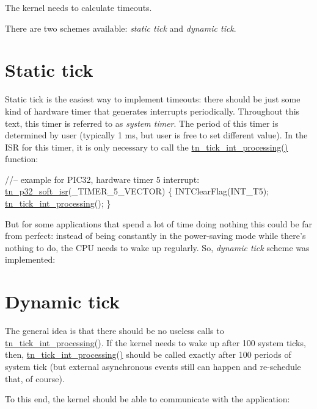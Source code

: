The kernel needs to calculate timeouts.

There are two schemes available\+: {\itshape static tick} and {\itshape dynamic tick}.\hypertarget{time_ticks_time_ticks__static_tick}{}\section{Static tick}\label{time_ticks_time_ticks__static_tick}
Static tick is the easiest way to implement timeouts\+: there should be just some kind of hardware timer that generates interrupts periodically. Throughout this text, this timer is referred to as {\itshape system timer}. The period of this timer is determined by user (typically 1 ms, but user is free to set different value). In the I\+S\+R for this timer, it is only necessary to call the {\ttfamily \hyperlink{tn__sys_8h_aa44d297639e0520420890ef2bb7e2c1c}{tn\+\_\+tick\+\_\+int\+\_\+processing()}} function\+:


\begin{DoxyCode}
\textcolor{comment}{//-- example for PIC32, hardware timer 5 interrupt:}
\hyperlink{tn__arch__pic32_8h_a02d853d8d573f928fb8da65ef0c2bc8e}{tn\_p32\_soft\_isr}(\_TIMER\_5\_VECTOR)
\{
   INTClearFlag(INT\_T5);
   \hyperlink{tn__sys_8h_aa44d297639e0520420890ef2bb7e2c1c}{tn\_tick\_int\_processing}();
\}
\end{DoxyCode}


But for some applications that spend a lot of time doing nothing this could be far from perfect\+: instead of being constantly in the power-\/saving mode while there's nothing to do, the C\+P\+U needs to wake up regularly. So, {\itshape dynamic tick} scheme was implemented\+:\hypertarget{time_ticks_time_ticks__dynamic_tick}{}\section{Dynamic tick}\label{time_ticks_time_ticks__dynamic_tick}
The general idea is that there should be no useless calls to {\ttfamily \hyperlink{tn__sys_8h_aa44d297639e0520420890ef2bb7e2c1c}{tn\+\_\+tick\+\_\+int\+\_\+processing()}}. If the kernel needs to wake up after 100 system ticks, then, {\ttfamily \hyperlink{tn__sys_8h_aa44d297639e0520420890ef2bb7e2c1c}{tn\+\_\+tick\+\_\+int\+\_\+processing()}} should be called exactly after 100 periods of system tick (but external asynchronous events still can happen and re-\/schedule that, of course).

To this end, the kernel should be able to communicate with the application\+:


